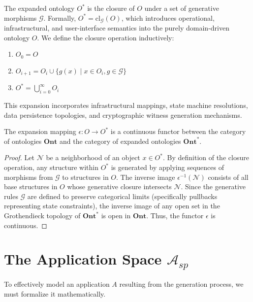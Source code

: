 \begin{definition}
The expanded ontology $O^*$ is the closure of $O$ under a set of generative morphisms $\mathcal{G}$. Formally, $O^* = \text{cl}_{\mathcal{G}}(O)$, which introduces operational, infrastructural, and user-interface semantics into the purely domain-driven ontology $O$. We define the closure operation inductively:
\begin{enumerate}
    \item $O_0 = O$
    \item $O_{i+1} = O_i \cup \{g(x) \mid x \in O_i, g \in \mathcal{G}\}$
    \item $O^* = \bigcup_{i=0}^{\infty} O_i$
\end{enumerate}
This expansion incorporates infrastructural mappings, state machine resolutions, data persistence topologies, and cryptographic witness generation mechanisms.
\end{definition}

\begin{lemma}
\label{lem:continuity_expansion}
The expansion mapping $\epsilon: O \to O^*$ is a continuous functor between the category of ontologies $\mathbf{Ont}$ and the category of expanded ontologies $\mathbf{Ont}^*$.
\end{lemma}

\begin{proof}
Let $\mathcal{N}$ be a neighborhood of an object $x \in O^*$. By definition of the closure operation, any structure within $O^*$ is generated by applying sequences of morphisms from $\mathcal{G}$ to structures in $O$. The inverse image $\epsilon^{-1}(\mathcal{N})$ consists of all base structures in $O$ whose generative closure intersects $\mathcal{N}$. Since the generative rules $\mathcal{G}$ are defined to preserve categorical limits (specifically pullbacks representing state constraints), the inverse image of any open set in the Grothendieck topology of $\mathbf{Ont}^*$ is open in $\mathbf{Ont}$. Thus, the functor $\epsilon$ is continuous.
\end{proof}

\section{The Application Space $\mathcal{A}_{sp}$}

To effectively model an application $A$ resulting from the generation process, we must formalize it mathematically.

